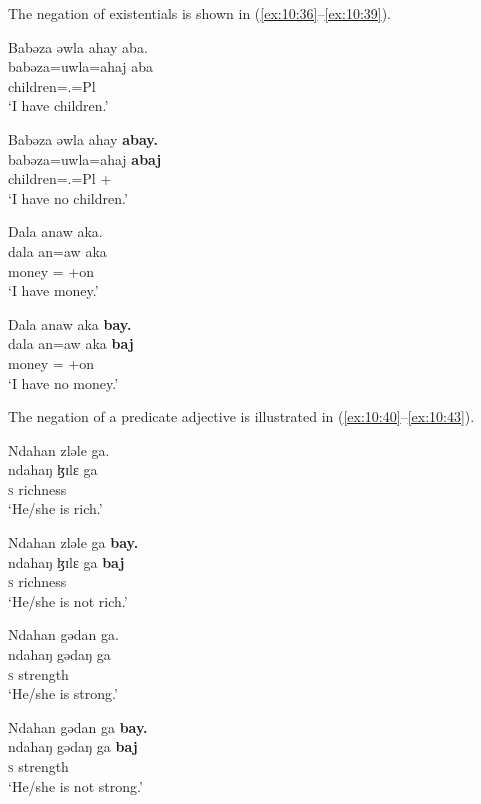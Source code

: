 The   negation of existentials is shown in (\ref{ex:10:36}--\ref{ex:10:39}). 

\ea \label{ex:10:36}
Babəza  əwla  ahay  aba. \\
\gll  babəza=uwla=ahaj  aba \\
      children={\oneS}.{\POSS}=Pl  {\EXT}\\
\glt  ‘I have children.’            
\z

\ea \label{ex:10:37}
Babəza  əwla  ahay  \textbf{abay.}\\
\gll  babəza=uwla=ahaj  \textbf{abaj}\\
      children={\oneS}.{\POSS}=Pl  {\EXT}+{\NEG}\\
\glt  ‘I have no children.’  
\z

\ea \label{ex:10:38}
Dala  anaw  aka. \\
\gll  dala   an=aw     aka\\
      money  {\DAT}={\oneS}  {\EXT}+on \\
\glt  ‘I have money.’           
\z

\ea \label{ex:10:39}
Dala  anaw  aka \textbf{bay.}\\
\gll  dala   an=aw     aka \textbf{baj}\\
      money  {\DAT}={\oneS}  {\EXT}+on    {\NEG}\\
\glt  ‘I have no money.’
\z

The  negation of a predicate adjective is illustrated in (\ref{ex:10:40}--\ref{ex:10:43}). 

\ea \label{ex:10:40}
Ndahan  zləle  ga.\\
\gll  ndahaŋ   ɮɪlɛ   ga\\
      \textsc{s}    richness  {\ADJ}\\
\glt  ‘He/she is rich.’           
\z

\ea \label{ex:10:41}
Ndahan  zləle  ga  \textbf{bay.}\\
\gll  ndahaŋ  ɮɪlɛ   ga   \textbf{baj}\\
      \textsc{s}    richness  {\ADJ}  {\NEG}\\
\glt  ‘He/she is not rich.’
\z

\ea \label{ex:10:42}
Ndahan  gədan  ga.\\
\gll  ndahaŋ   gədaŋ   ga\\
      \textsc{s}    strength  {\ADJ}\\
\glt  ‘He/she is strong.’            
\z

\ea \label{ex:10:43}
Ndahan  gədan  ga  \textbf{bay.}\\
\gll  ndahaŋ   gədaŋ   ga   \textbf{baj}\\
      \textsc{s}    strength  {\ADJ}  {\NEG}\\
\glt  ‘He/she is not strong.’
\z

